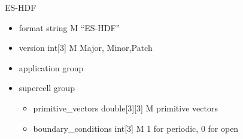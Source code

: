 ES-HDF
\begin{itemize}
  \item format {\color{red} string}  M  ``ES-HDF''
  \item version {\color{red} int[3]} M Major, Minor,Patch
  \item application {\color{red} group} 
  \item supercell   {\color{red} group}
  \begin{itemize}
    \item primitive\_vectors {\color{red} double[3][3]}  M primitive vectors
    \item boundary\_conditions  {\color{red} int[3]      }  M  1 for periodic, 0 for open
  \end{itemize}
\end{itemize}

